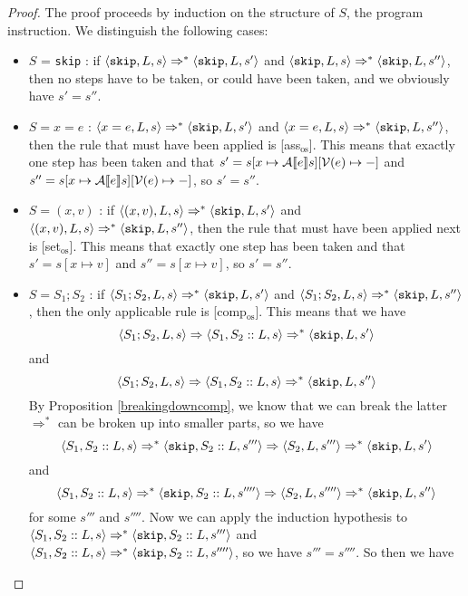 \begin{proof}
The proof proceeds by induction on the structure of $S$, the program instruction. We distinguish the following cases:
\begin{itemize}[noitemsep]
    \item $S$ = \texttt{skip} : if $\langle \texttt{skip}, L, s \rangle \Rightarrow ^{*} \langle \texttt{skip}, L, s' \rangle$ and $\langle \texttt{skip}, L, s \rangle \Rightarrow ^{*} \langle \texttt{skip}, L, s'' \rangle$, then no steps have to be taken, or could have been taken, and we obviously have $s' = s''$.
    \item $S = x = e$ : $\langle x= e, L, s \rangle \Rightarrow ^{*} \langle \texttt{skip}, L, s' \rangle$ and $\langle x = e, L, s \rangle \Rightarrow ^{*} \langle \texttt{skip}, L, s'' \rangle$, then the rule that must have been applied is [ass$_{\textrm{os}}$]. This means that exactly one step has been taken and that $s'=s[x \mapsto \mathcal{A} \llbracket e \rrbracket s][\mathcal{V}(e)\mapsto-]$ and $s'' = s[x \mapsto \mathcal{A} \llbracket e \rrbracket s][\mathcal{V}(e)\mapsto-]$, so $s' = s''$.
    \item $S = (x,v)$ : if $\langle (x,v), L, s \rangle \Rightarrow ^{*} \langle \texttt{skip}, L, s' \rangle$ and $\langle (x,v), L, s \rangle \Rightarrow ^{*} \langle \texttt{skip}, L, s'' \rangle$, then the rule that must have been applied next is [set$_{\textrm{os}}$]. This means that exactly one step has been taken and that $s' = s[x\mapsto v]$ and $s'' = s[x\mapsto v]$, so $s' = s''$.
    \item $S = S_1; S_2$ : if $\langle S_1; S_2, L, s \rangle \Rightarrow ^{*} \langle \texttt{skip}, L, s' \rangle$ and $\langle S_1; S_2, L, s \rangle \Rightarrow ^{*} \langle \texttt{skip}, L, s'' \rangle$, then the only applicable rule is [comp$_{\textrm{os}}$]. This means that we have 
    $$\langle S_1; S_2, L, s \rangle \Rightarrow \langle S_1, S_2::L, s \rangle \Rightarrow ^{*} \langle \texttt{skip}, L, s' \rangle$$
    and 
    $$\langle S_1; S_2, L, s \rangle \Rightarrow \langle S_1, S_2::L, s \rangle  \Rightarrow ^{*} \langle \texttt{skip}, L, s'' \rangle$$
    By Proposition \ref{breakingdowncomp}, we know that we can break the latter $\Rightarrow ^{*}$ can be broken up into smaller parts, so we have 
     $$\langle S_1, S_2::L, s \rangle \Rightarrow ^{*} \langle \texttt{skip}, S_2::L, s''' \rangle \Rightarrow \langle S_2, L, s''' \rangle \Rightarrow ^{*} \langle \texttt{skip}, L, s' \rangle$$
     and
     $$\langle S_1, S_2::L, s \rangle \Rightarrow ^{*} \langle \texttt{skip}, S_2::L, s'''' \rangle \Rightarrow \langle S_2, L, s'''' \rangle \Rightarrow ^{*} \langle \texttt{skip}, L, s'' \rangle$$
     for some $s'''$ and $s''''$. Now we can apply the induction hypothesis to $\langle S_1, S_2::L, s \rangle \Rightarrow ^{*} \langle \texttt{skip}, S_2::L, s''' \rangle$ and $\langle S_1, S_2::L, s \rangle \Rightarrow ^{*} \langle \texttt{skip}, S_2::L, s'''' \rangle$, so we have $s''' = s''''$. So then we have 

\end{itemize}
\end{proof}
